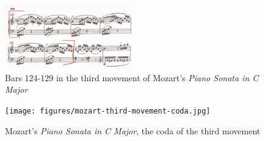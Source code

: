 \begin{figure}
	\centering
	\includegraphics[width=0.5\textwidth]{figures/mozart-third-movement-bars-124-129.jpg}
	\caption{Bars 124-129 in the third movement of Mozart's \textit{Piano Sonata in C Major}}
	\label{fig:mozart-third-movement-bars-124-129}
\end{figure}

\begin{figure}
    \centering
    \texttt{[image: figures/mozart-third-movement-coda.jpg]}
    \caption{Mozart's \textit{Piano Sonata in C Major}, the coda of the third movement}
    \label{fig:mozart-third-movement-coda}
\end{figure}
